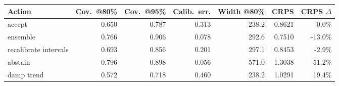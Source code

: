 \begin{tabular}{lrrrrrr}
\toprule
Action & Cov.\ @80\% & Cov.\ @95\% & Calib.\ err. & Width @80\% & CRPS & CRPS $\Delta$ \\
\midrule
accept & 0.650 & 0.787 & 0.313 & 238.2 & 0.8621 & 0.0\% \\
ensemble & 0.766 & 0.906 & 0.078 & 292.6 & 0.7510 & -13.0\% \\
recalibrate intervals & 0.693 & 0.856 & 0.201 & 297.1 & 0.8453 & -2.9\% \\
abstain & 0.796 & 0.898 & 0.056 & 571.0 & 1.3038 & 51.2\% \\
damp trend & 0.572 & 0.718 & 0.460 & 238.2 & 1.0291 & 19.4\% \\
\bottomrule
\end{tabular}

